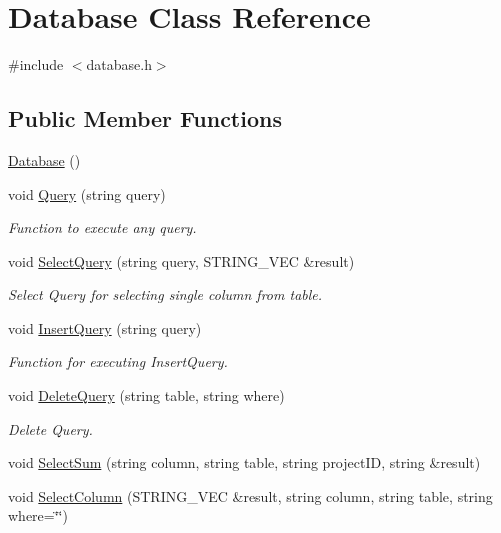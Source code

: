 \hypertarget{classDatabase}{\section{Database Class Reference}
\label{classDatabase}
}


{\ttfamily \#include $<$database.\-h$>$}

\subsection*{Public Member Functions}
\begin{DoxyCompactItemize}
\item 
\hyperlink{classDatabase_a4703c80e6969d33565ea340f768fdadf}{Database} ()
\item 
void \hyperlink{classDatabase_ab790a68bd8fdbd36133d56ca21ec45d0}{Query} (string query)
\begin{DoxyCompactList}\small\item\em Function to execute any query. \end{DoxyCompactList}\item 
void \hyperlink{classDatabase_a4ccf07a8481a83055d8ce5fd27f0b415}{Select\-Query} (string query, S\-T\-R\-I\-N\-G\-\_\-\-V\-E\-C \&result)
\begin{DoxyCompactList}\small\item\em Select Query for selecting single column from table. \end{DoxyCompactList}\item 
void \hyperlink{classDatabase_a63d8c1af7507b1dcdc81a411f9a0b4b4}{Insert\-Query} (string query)
\begin{DoxyCompactList}\small\item\em Function for executing Insert\-Query. \end{DoxyCompactList}\item 
void \hyperlink{classDatabase_a3ae42b73dea23470871c86af6b50bbf2}{Delete\-Query} (string table, string where)
\begin{DoxyCompactList}\small\item\em Delete Query. \end{DoxyCompactList}\item 
void \hyperlink{classDatabase_af237df2de117cf94e23d288ad3345ca0}{Select\-Sum} (string column, string table, string project\-I\-D, string \&result)
\item 
void \hyperlink{classDatabase_a52049c686ad213533bdb1c4f2ac3c157}{Select\-Column} (S\-T\-R\-I\-N\-G\-\_\-\-V\-E\-C \&result, string column, string table, string where=\char`\"{}\char`\"{})

\end{DoxyCompactItemize}
